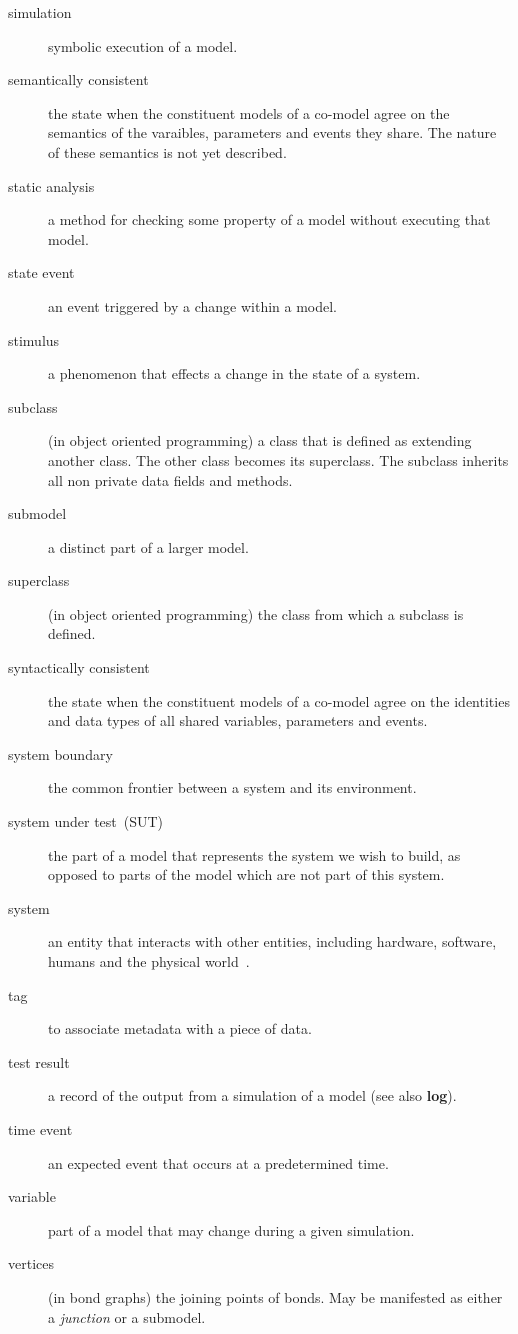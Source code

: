 \documentclass{crescendorepchap}
\begin{document}
\begin{description}
\item[simulation] symbolic execution of a model.
\item[semantically consistent] the state when the constituent models of a co-model agree on the semantics of the varaibles, parameters and events they share.  The nature of these semantics is not yet described.
\item[static analysis] a method for checking some property of a model without executing that model.
\item[state event] an event triggered by a change within a model.
\item[stimulus] a phenomenon that effects a change in the state of a system.
\item[subclass] (in object oriented programming) a class that is defined as extending another class.  The other class becomes its superclass.  The subclass inherits all non private data fields and methods.
\item[submodel] a distinct part of a larger model.
\item[superclass] (in object oriented programming) the class from which a subclass is defined.
\item[syntactically consistent] the state when the constituent models of a co-model agree on the identities and data types of all shared variables, parameters and events.
\item[system boundary] the common frontier between a system and its environment.
\item[system under test~(SUT)] the part of a model that represents the system we wish to build, as opposed to parts of the model which are not part of this system.
\item[system] an entity that interacts with other entities, including hardware, software, humans and the physical world~\cite{Avizienis&04}.
\item[tag] to associate metadata with a piece of data.
\item[test result] a record of the output from a simulation of a model (see also \textbf{log}).
\item[time event] an expected event that occurs at a predetermined time.
\item[variable] part of a model that may change during a given simulation.
\item[vertices] (in bond graphs) the joining points of bonds.  May be manifested as either a \textit{junction} or a submodel.
\end{description} 
\end{document}
